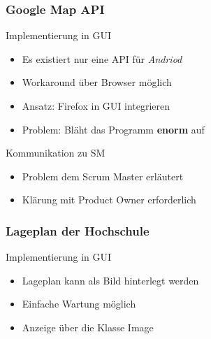 \begin{frame}
	\frametitle{Google Map API}
%
	\begin{block}{Implementierung in GUI}
		\begin{itemize}
			\item Es existiert nur eine API für \textit{Andriod}
			\item Workaround über Browser möglich
			\item Ansatz: Firefox in GUI integrieren
			\item Problem: Bläht das Programm \textbf{enorm} auf
		\end{itemize}
	\end{block}
%
	\begin{block}{Kommunikation zu SM}
		\begin{itemize}
			\item Problem dem Scrum Master erläutert
			\item Klärung mit Product Owner erforderlich
		\end{itemize}
	\end{block}
\end{frame}
%
%
%
\begin{frame}
	\frametitle{Lageplan der Hochschule}
%
	\begin{block}{Implementierung in GUI}
		\begin{itemize}
			\item Lageplan kann als Bild hinterlegt werden
			\item Einfache Wartung möglich
			\item Anzeige über die Klasse Image
		\end{itemize}
	\end{block}
\end{frame}
%
%
%
